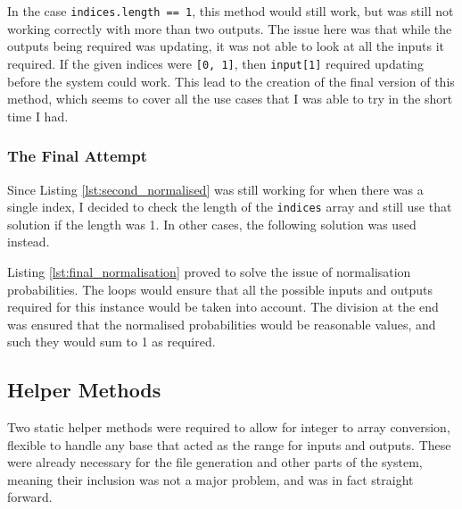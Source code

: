 \documentclass[report.tex]{subfiles}
\begin{document}
 

In the case \texttt{indices.length == 1}, this method would still work, but was
still not working correctly with more than two outputs. The issue here was that
while the outputs being required was updating, it was not able to look at all
the inputs it required. If the given indices were \texttt{[0, 1]}, then
\texttt{input[1]} required updating before the system could work. This lead to
the creation of the final version of this method, which seems to cover all the
use cases that I was able to try in the short time I had.

\subsubsection{The Final Attempt} %
\label{ssub:the_final_attempt}
Since Listing \ref{lst:second_normalised} was still working for when there was
a single index, I decided to check the length of the \texttt{indices} array and
still use that solution if the length was 1. In other cases, the following
solution was used instead.

 

Listing \ref{lst:final_normalisation} proved to solve the issue of
normalisation probabilities. The loops would ensure that all the possible
inputs and outputs required for this instance would be taken into account.
The division at the end was ensured that the normalised probabilities would be
reasonable values, and such they would sum to 1 as required.

\subsection{Helper Methods} %
\label{sub:helper_methods}
Two static helper methods were required to allow for integer to array
conversion, flexible to handle any base that acted as the range for inputs and
outputs. These were already necessary for the file generation and other parts
of the system, meaning their inclusion was not a major problem, and was in fact
straight forward.
\end{document}
